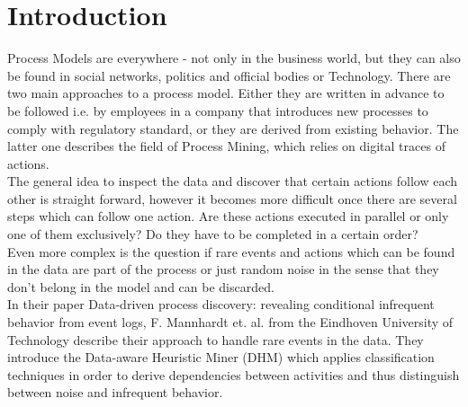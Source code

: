 
\chapter{Introduction} %

\label{Chapter1} %


\newcommand{\keyword}[1]{\textbf{#1}}
\newcommand{\tabhead}[1]{\textbf{#1}}
\newcommand{\code}[1]{\texttt{#1}}
\newcommand{\file}[1]{\texttt{\bfseries#1}}
\newcommand{\option}[1]{\texttt{\itshape#1}}


Process Models are everywhere - not only in the business world, but they can also be found in social networks, politics and official bodies or Technology. There are two main approaches to a process model. Either they are written in advance to be followed i.e. by employees in a company that introduces new processes to comply with regulatory standard, or they are derived from existing behavior. The latter one describes the field of Process Mining, which relies on digital traces of actions. \\

The general idea to inspect the data and discover that certain actions follow each other is straight forward, however it becomes more difficult once there are several steps which can follow one action. Are these actions executed in parallel or only one of them exclusively? Do they have to be completed in a certain order?\\
Even more complex is the question if rare events and actions which can be found in the data are part of the process or just random noise in the sense that they don't belong in the model and can be discarded.\\

In their paper \grqq{}Data-driven process discovery: revealing conditional infrequent behavior from event logs\grqq{}, F. Mannhardt et. al. from the Eindhoven University of Technology describe their approach to handle rare events in the data. They introduce the \glqq{}Data-aware Heuristic Miner\grqq{} (DHM) which applies classification techniques in order to derive dependencies between activities and thus distinguish between noise and infrequent behavior.\\

